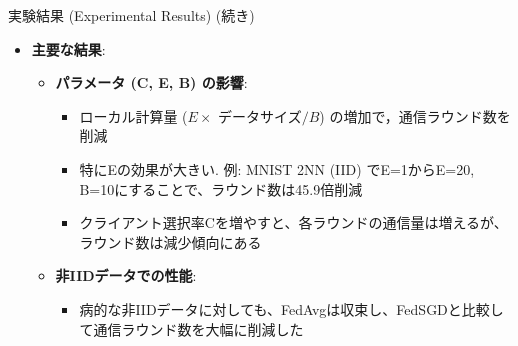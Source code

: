 \documentclass[unicode,12pt,aspectratio=169, dvipdfmx]{beamer}
\begin{document}
\begin{frame}{実験結果 (Experimental Results) (続き)}
\begin{itemize}
    \item \textbf{主要な結果}:
    \begin{itemize}
        \item \textbf{パラメータ (C, E, B) の影響}:
        \begin{itemize}
            \item ローカル計算量 ($E \times $ データサイズ$/B$) の増加で，通信ラウンド数を削減
            \item 特にEの効果が大きい. 例: MNIST 2NN (IID) でE=1からE=20, B=10にすることで、ラウンド数は45.9倍削減
            \item クライアント選択率Cを増やすと、各ラウンドの通信量は増えるが、ラウンド数は減少傾向にある
        \end{itemize}
        \item \textbf{非IIDデータでの性能}:
        \begin{itemize}
            \item 病的な非IIDデータに対しても、FedAvgは収束し、FedSGDと比較して通信ラウンド数を大幅に削減した
        \end{itemize}
    \end{itemize}
\end{itemize}
\end{frame}
\end{document}
